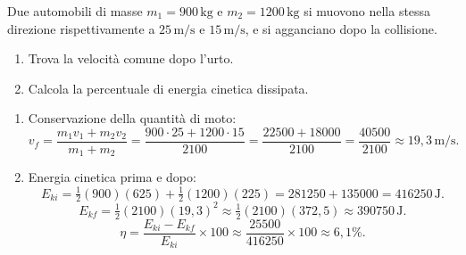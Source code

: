 \begin{question}[ID=3.4, subtitle={Velocità comune e percentuale di energia dissipata}, tags={urti anelastici, energia dissipata}, difficulty=difficile]
Due automobili di masse \(m_1 = 900 \, \text{kg}\) e \(m_2 = 1200 \, \text{kg}\) si muovono nella stessa direzione rispettivamente a \(25 \, \text{m/s}\) e \(15 \, \text{m/s}\), e si agganciano dopo la collisione.
\begin{enumerate}
    \item Trova la velocità comune dopo l'urto.
    \item Calcola la percentuale di energia cinetica dissipata.
\end{enumerate}
\begin{solution}
    \begin{enumerate}
        \item Conservazione della quantità di moto:
        \[
            v_f = \frac{m_1 v_1 + m_2 v_2}{m_1+m_2} = \frac{900 \cdot 25 + 1200 \cdot 15}{2100} = \frac{22500 + 18000}{2100} = \frac{40500}{2100} \approx 19{,}3 \, \text{m/s}.
        \]
        \item Energia cinetica prima e dopo:
        \[
            E_{ki} = \tfrac{1}{2}(900)(625) + \tfrac{1}{2}(1200)(225) = 281250 + 135000 = 416250 \, \text{J}.
        \]
        \[
            E_{kf} = \tfrac{1}{2}(2100)(19{,}3)^2 \approx \tfrac{1}{2}(2100)(372{,}5) \approx 390750 \, \text{J}.
        \]
        \[
            \eta = \frac{E_{ki} - E_{kf}}{E_{ki}} \times 100 \approx \frac{25500}{416250} \times 100 \approx 6{,}1\%.
        \]
    \end{enumerate}
\end{solution}
\end{question}


